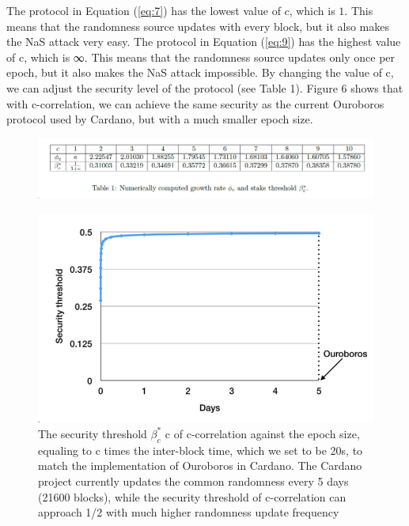 \documentclass{report}
\begin{document}
The protocol in Equation (\ref{eq:7}) has the lowest value of $c$, which is $1$. This means that the randomness source updates with every block, but it also makes the NaS attack very easy. The protocol in Equation (\ref{eq:9}) has the highest value of c, which is ∞. This means that the randomness source updates only once per epoch, but it also makes the NaS attack impossible. By changing the value of c, we can adjust the security level of the protocol (see Table 1). Figure 6 shows that with c-correlation, we can achieve the same security as the current Ouroboros protocol used by Cardano, but with a much smaller epoch size.
\begin{figure}[h!]
	\centering
	\includegraphics[width=\linewidth]{Fig/F6}
\end{figure}
\begin{figure}[h!]
	\centering
	\includegraphics[width=0.5\linewidth]{Fig/F7}
	\caption{The security threshold $\beta_c^*$
		c of c-correlation against the epoch size, equaling to c times the
		inter-block time, which we set to be 20s, to match the implementation of Ouroboros in Cardano. The
		Cardano project currently updates the common randomness every 5 days (21600 blocks), while the
		security threshold of c-correlation can approach 1/2 with much higher randomness update frequency}
	\label{fig:f7}
\end{figure}
\end{document}
